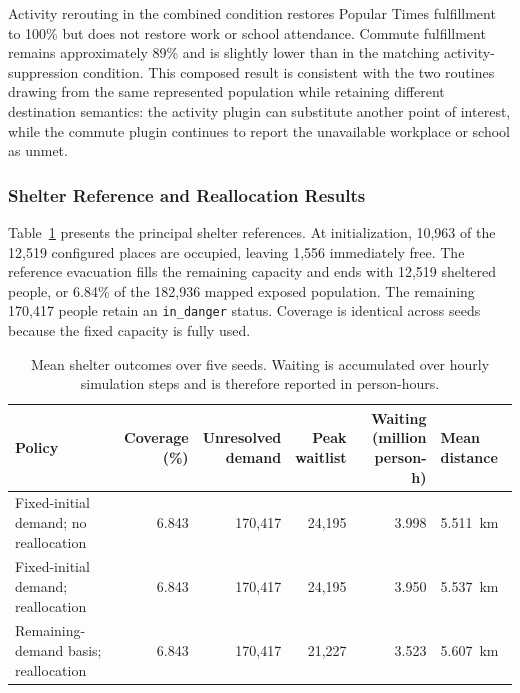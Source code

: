 Activity rerouting in the combined condition restores Popular Times fulfillment to 100\% but does not restore work or school attendance. Commute fulfillment remains approximately 89\% and is slightly lower than in the matching activity-suppression condition. This composed result is consistent with the two routines drawing from the same represented population while retaining different destination semantics: the activity plugin can substitute another point of interest, while the commute plugin continues to report the unavailable workplace or school as unmet.

\subsubsection{Shelter Reference and Reallocation Results}

Table~\ref{tbl:shelter_reference_results} presents the principal shelter references. At initialization, 10,963 of the 12,519 configured places are occupied, leaving 1,556 immediately free. The reference evacuation fills the remaining capacity and ends with 12,519 sheltered people, or 6.84\% of the 182,936 mapped exposed population. The remaining 170,417 people retain an \texttt{in\_danger} status. Coverage is identical across seeds because the fixed capacity is fully used.

\begin{table}[ht]
\centering
\footnotesize
\caption{Mean shelter outcomes over five seeds. Waiting is accumulated over hourly simulation steps and is therefore reported in person-hours.}
\label{tbl:shelter_reference_results}
\begin{tabularx}{\linewidth}{@{}lrrrrX@{}}
\toprule
\textbf{Policy} &
\shortstack{\textbf{Coverage}\\\textbf{(\%)}} &
\shortstack{\textbf{Unresolved}\\\textbf{demand}} &
\shortstack{\textbf{Peak}\\\textbf{waitlist}} &
\shortstack{\textbf{Waiting}\\\textbf{(million person-h)}} &
\textbf{Mean distance} \\
\midrule
Fixed-initial demand; no reallocation
    & 6.843 & 170,417 & 24,195 & 3.998 & 5.511~km \\
Fixed-initial demand; reallocation
    & 6.843 & 170,417 & 24,195 & 3.950 & 5.537~km \\
Remaining-demand basis; reallocation
    & 6.843 & 170,417 & 21,227 & 3.523 & 5.607~km \\
\bottomrule
\end{tabularx}
\end{table}

